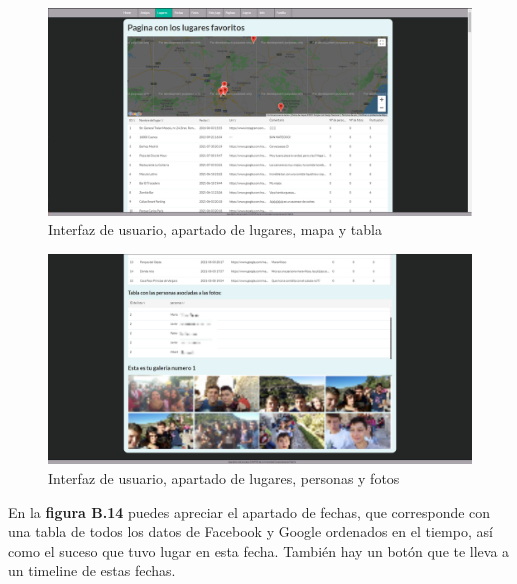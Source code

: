 \begin{figure}
	\begin{center}
		\includegraphics[scale=0.3]{Imagenes/Fuentes/InterfazLugares1.png} \caption{Interfaz de usuario, apartado de lugares, mapa y tabla}
		\label{WebAplication3}
	\end{center}
\end{figure}
\begin{figure}
	\begin{center}
		\includegraphics[scale=0.3]{Imagenes/Fuentes/InterfazLugares2.png} \caption{Interfaz de usuario, apartado de lugares, personas y fotos}
		\label{WebAplication4}
	\end{center}
\end{figure}

En la \textbf{figura B.14} puedes apreciar el apartado de fechas, que corresponde con una tabla de todos los datos de Facebook y Google ordenados en el tiempo, así como el suceso que tuvo lugar en esta fecha. También hay un botón que te lleva a un timeline de estas fechas.

